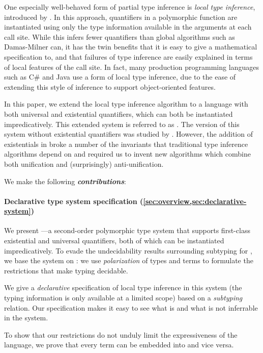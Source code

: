 One especially well-behaved form of partial type inference is 
\emph{local type inference}, introduced by \citet{pierce2000:local}. In this approach,
quantifiers in a polymorphic function are instantiated using only the type
information available in the arguments at each call site. While this infers
fewer quantifiers than global algorithms such as Damas-Milner can, it has the
twin benefits that it is easy to give a mathematical specification to, and that
failures of type inference are easily explained in terms of local features of
the call site. In fact, many production programming languages such as C\# and
Java use a form of local type inference, due to the ease of extending this style
of inference to support object-oriented features. 

In this paper, we extend the local type inference algorithm to a language with
both universal and existential quantifiers, which can both be instantiated
impredicatively. This extended system is referred to as \fexists. 
The version of this system without existential quantifiers was studied 
by \citet{mercer2019:system-f}. However, the addition of existentials in \fexists
broke a number of the invariants that traditional type inference algorithms depend
 on and required us to invent new algorithms which combine both unification and 
 (surprisingly) anti-unification.

We make the following \emph{\textbf{contributions}}:

\paragraph*{Declarative type system specification (\cref{sec:overview,sec:declarative-system})} 
    We present \fexists---a second-order polymorphic type system that supports first-class
    existential and universal quantifiers, both of which can be instantiated
    impredicatively. To evade the undecidability results surrounding subtyping
    for \systemf, we base the system on \CBPV \cite{levy2006:cbpv}: we
    use \emph{polarization} of types and terms to formulate the restrictions
    that make typing decidable. 

    We give a \emph{declarative} specification of local type inference in this
    system (\ie the typing information is only available at a limited scope)
    based on a \emph{subtyping} relation. Our specification makes it easy to see
    what is and what is not inferrable in the system. 

    To show that our restrictions do not unduly limit the expressiveness of the
    language, we prove that every \fexists term can be embedded into \systemf
    and vice versa.

